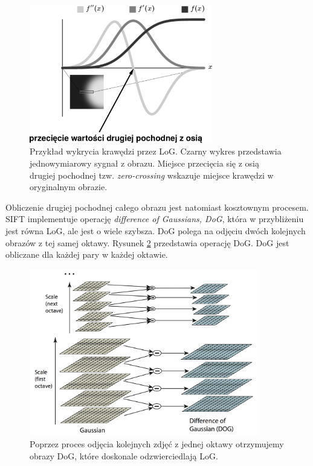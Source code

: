 \begin{figure}[H]
  \centering
  \includegraphics[width=8cm]{gfx/gauss}
  \caption{Przykład wykrycia krawędzi przez LoG. Czarny wykres przedstawia jednowymiarowy sygnał z obrazu. Miejsce przecięcia się z osią drugiej pochodnej tzw. \textit{zero-crossing} wskazuje miejsce krawędzi w oryginalnym obrazie.}
  \label{fig:proponowane_algorytmy:gauss}
\end{figure}

Obliczenie drugiej pochodnej całego obrazu jest natomiast kosztownym procesem. SIFT implementuje operację \textit{difference of Gaussians, DoG}, która w przybliżeniu jest równa LoG, ale jest o wiele szybsza. DoG polega na odjęciu dwóch kolejnych obrazów z tej samej oktawy. Rysunek \ref{fig:proponowane_algorytmy:dog} przedstawia operację DoG. DoG jest obliczane dla każdej pary w każdej oktawie.

\begin{figure}[htb]
  \centering
  \includegraphics[width=10cm]{gfx/dog}
  \caption{\cite{Lowe:2004:DIF:993451.996342} Poprzez proces odjęcia kolejnych zdjęć z jednej oktawy otrzymujemy obrazy DoG, które doskonale odzwierciedlają LoG.}
  \label{fig:proponowane_algorytmy:dog}
\end{figure}

